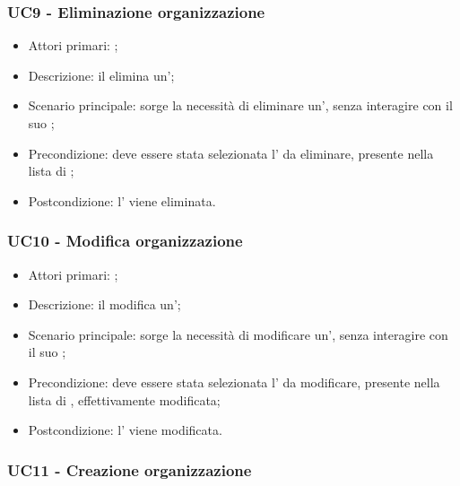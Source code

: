 \documentclass[../analisi-dei-requisiti]{subfiles}
\begin{document}
\subsubsection{UC9 - Eliminazione organizzazione}
\label{subsub:UC9}

\begin{itemize}
\item Attori primari: ;
\item Descrizione: il  elimina un';
\item Scenario principale: sorge la necessità di eliminare un', senza interagire con il suo ; 
\item Precondizione: deve essere stata selezionata l' da eliminare, presente nella lista di ;
\item Postcondizione: l' viene eliminata.

\end{itemize}


\subsubsection{UC10 - Modifica organizzazione}
\label{subsub:UC10}

\begin{itemize}
\item Attori primari: ;
\item Descrizione: il  modifica un';
\item Scenario principale: sorge la necessità di modificare un', senza interagire con il suo ; 
\item Precondizione: deve essere stata selezionata l' da modificare, presente nella lista di , effettivamente modificata;
\item Postcondizione: l' viene modificata.

\end{itemize}


\subsubsection{UC11 - Creazione organizzazione}
\label{subsub:UC11}
\end{document}
